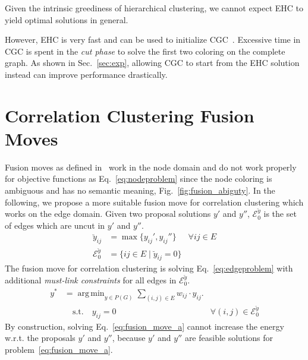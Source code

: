 \documentclass[10pt,twocolumn,letterpaper]{article}
\DeclareMathOperator*{\argmin}{arg\,min}
\theoremstyle{definition}
\begin{document}
Given the intrinsic greediness of hierarchical clustering, we cannot expect
EHC to yield optimal solutions in general.

However, EHC is very fast and can be used to initialize
CGC~\cite{beier_2014_cvpr}. Excessive time in CGC
is spent in the \emph{cut phase} to solve the 
first two coloring on the complete graph.
As shown in Sec.~\ref{sec:exp},
allowing CGC to start from the EHC solution instead
can improve performance drastically.






\section{Correlation Clustering Fusion Moves}\label{sec:cc_fm}

Fusion moves as defined in~\cite{Lempitsky-2010} work
in the node domain and do not work properly for 
objective functions as Eq.~\ref{eq:nodeproblem} since
the node coloring is ambiguous and has no semantic meaning, \cf Fig.~\ref{fig:fusion_abiguty}.
In the following, we propose a more suitable fusion move for correlation
clustering which works on the edge domain.
%
Given two proposal solutions $y'$ and $y''$,
$\mathcal{E}_0^{\breve{y}}$ is the set of edges
which are uncut in $y'$ and $y''$.
%
\begin{align}
\breve{y}_{ij}    & = \max\{ y_{ij}', y_{ij}''\}  & \forall {ij}\in E\\  %
\mathcal{E}_0^{\breve{y}}  & =  \{ ij \in E \; | \; \breve{y}_{ij} = 0 \}
\end{align}
%
The fusion move for correlation clustering is solving Eq.~\ref{eq:edgeproblem}
with additional \emph{must-link constraints} for all edges in $\mathcal{E}_0^{\breve{y}}$.
%
\begin{align}
  y^* &= \argmin_{y \in P(G)} \sum_{ (i,j) \in E } w_{ij} \cdot y_{ij} \label{eq:fusion_move_a}.\\ 
      &\quad \textrm{s.t.} \quad y_{ij} = 0 & \forall (i, j) \in \mathcal{E}_0^{\breve{y}} \nonumber
\end{align}
%
By construction, solving Eq.~\ref{eq:fusion_move_a} cannot increase the energy w.r.t. the proposals
$y'$ and $y''$,
because $y'$ and $y''$ are feasible solutions for problem~\ref{eq:fusion_move_a}.
%
\end{document}

